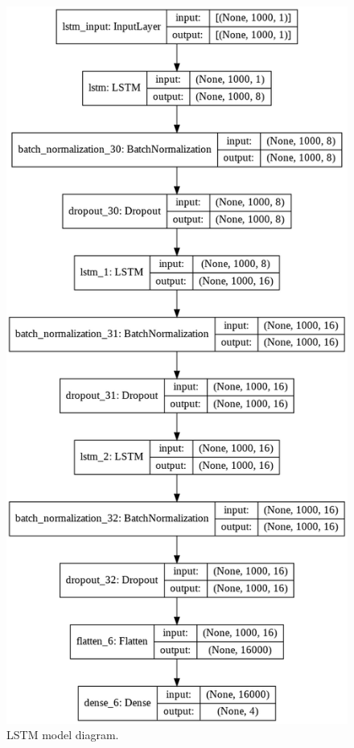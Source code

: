 \pagebreak
\begin{figure}[p]
	\centering
	\includegraphics[scale = 0.4,keepaspectratio=true]{./fig/lstmmodel.PNG}
	\caption{LSTM model diagram.}	
	\label{lstmmodel}
\end{figure}
